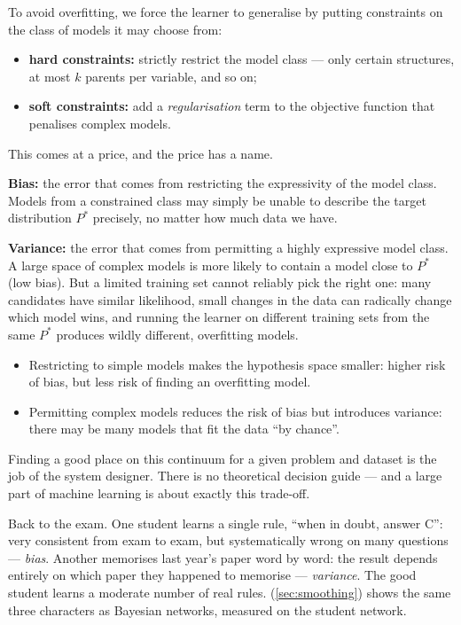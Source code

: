 \documentclass[11pt, oneside]{book}
\begin{document}
To avoid overfitting, we force the learner to generalise by putting
constraints on the class of models it may choose from:
\begin{itemize}
  \item \textbf{hard constraints:} strictly restrict the model class --- only
    certain structures, at most $k$ parents per variable, and so on;
  \item \textbf{soft constraints:} add a \emph{regularisation} term to the
    objective function that penalises complex models.
\end{itemize}
This comes at a price, and the price has a name.

\begin{defbox}[title={Bias and variance}]
\textbf{Bias:} the error that comes from restricting the expressivity of the
model class. Models from a constrained class may simply be unable to describe
the target distribution $P^*$ precisely, no matter how much data we have.\par
\textbf{Variance:} the error that comes from permitting a highly expressive
model class. A large space of complex models is more likely to contain a model
close to $P^*$ (low bias). But a limited training set cannot reliably pick the
right one: many candidates have similar likelihood, small changes in the data
can radically change which model wins, and running the learner on different
training sets from the same $P^*$ produces wildly different, overfitting
models.
\end{defbox}

\begin{thmbox}[title={The bias--variance trade-off}, unbreakable]
\begin{itemize}
  \item Restricting to simple models makes the hypothesis space smaller:
    higher risk of bias, but less risk of finding an overfitting model.
  \item Permitting complex models reduces the risk of bias but introduces
    variance: there may be many models that fit the data ``by chance''.
\end{itemize}
Finding a good place on this continuum for a given problem and dataset is the
job of the system designer. There is no theoretical decision guide --- and a
large part of machine learning is about exactly this trade-off.
\end{thmbox}

\begin{intbox}[unbreakable]
Back to the exam. One student learns a single rule, ``when in doubt, answer
C'': very consistent from exam to exam, but systematically wrong on many
questions --- \emph{bias}. Another memorises last year's paper word by word:
the result depends entirely on which paper they happened to memorise ---
\emph{variance}. The good student learns a moderate number of real rules.
 (\cref{sec:smoothing}) shows the same three
characters as Bayesian networks, measured on the student network.
\end{intbox}
\end{document}
